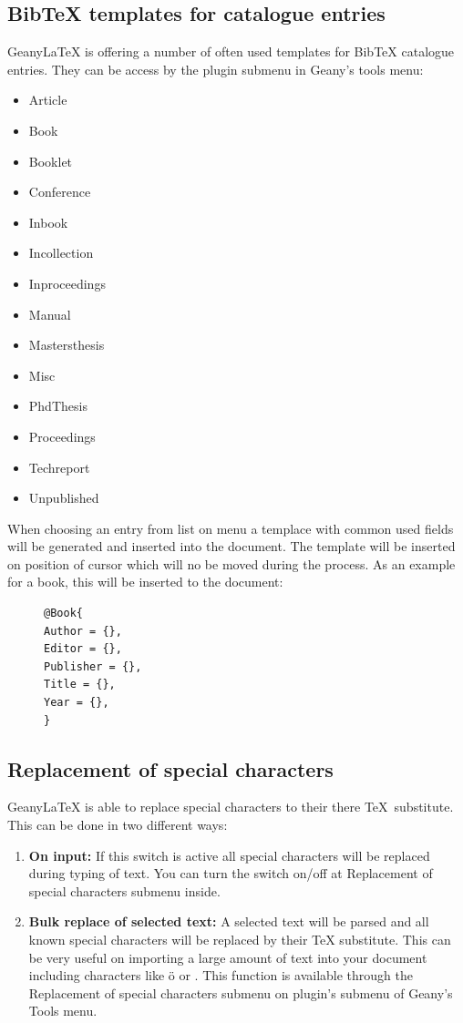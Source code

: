 \documentclass[%
a4paper,%
10pt,%
oneside,%
DIV18,
headsepline,
plainheadsepline,
footsepline,
plainfootsepline,
bibtotoc,%
liststotoc,%
BCOR12mm,%
halfparskip,%
openany,%
]{scrartcl}
\begin{document}
\subsection{BibTeX templates for catalogue entries}
Geany\LaTeX{} is offering a number of often used templates for BibTeX
catalogue entries. They can be access by the plugin submenu in Geany's
tools menu:
\begin{itemize}
	\item Article
	\item Book
	\item Booklet
	\item Conference
	\item Inbook
	\item Incollection
	\item Inproceedings
	\item Manual
	\item Mastersthesis
	\item Misc
	\item PhdThesis
	\item Proceedings
	\item Techreport
	\item Unpublished
\end{itemize}
When choosing an entry from list on menu a templace with common used
fields will be generated and inserted into the document.
The template will be inserted on position of cursor which will
no be moved during the process. As an example for a book, this will be
inserted to the document:

\begin{figure}[h!]
\begin{lstlisting}
@Book{
Author = {},
Editor = {},
Publisher = {},
Title = {},
Year = {},
}
\end{lstlisting}
\end{figure}

\subsection{Replacement of special characters}
Geany\LaTeX{} is able to replace special characters to their there \TeX\
substitute. This can be done in two different ways:

\begin{enumerate}
	\item \textbf{On input:} If this switch is active all special
		  characters will be replaced during typing of text. You can
		  turn the switch on/off at Replacement of special characters
		  submenu inside.
	\item \textbf{Bulk replace of selected text:}
		  A selected text will be parsed and all known special characters
		  will be replaced by their \TeX{} substitute. This can be very useful
		  on importing a large amount of text into your document
		  including characters like ö or \frqq. This function is
		  available through the Replacement of special characters
		  submenu on plugin's submenu of Geany's Tools menu.
\end{enumerate}
\end{document}

